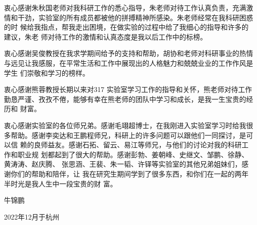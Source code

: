\cleardoublepage
{}

{%
}
{%

衷心感谢朱秋国老师对我科研工作的悉心指导，朱老师对待工作认真负责，充满激
情和干劲，实验室的所有成员都被他的拼搏精神所感染。朱老师经常在我科研困惑的时
候给我指点，帮我走出困境，在做实验的过程中给了我细心的指导和许多的建议，朱老
师对待工作的激情和认真态度是我以后工作中的标榜。

衷心感谢吴俊教授在我求学期间给予的支持和帮助，胡协和老师对科研事业的热情
与远见让我感服，在平常生活和工作中展现出的人格魅力和兢兢业业的工作作风是学生
们崇敬和学习的榜样。

衷心感谢熊蓉教授长期以来对317 实验室学习工作的指导和关怀，熊老师对待工作
勤恳严谨、孜孜不倦，能够有幸在熊老师的团队中学习和成长，是我一生宝贵的经历和
财富。

衷心感谢实验室的各位师兄弟。感谢毛翊超博士，在我刚进入实验室学习时给我很
多帮助。感谢李奕达和王鹏程师兄，科研上的许多问题可以跟他们一同探讨，是可以信
赖的良师益友。感谢石拓、留云、易江等师兄，与他们的讨论对我的科研工作和职业规
划都起到了很大的帮助。感谢彭勃、姜朝峰、史继文、邹鹏、徐静、黄涛涛、赵庆腾、
张思涵、王裴、朱一韬、许铎等实验室的其他兄弟姐妹们，感谢你们的帮助和陪伴，让
我在研究生期间学到了很多东西，和你们在一起的两年半时光是我人生中一段宝贵的财
富。

    \begin{flushright}
        \vspace*{\fill}
        牛锦鹏

        2022年12月于杭州
    \end{flushright}
}